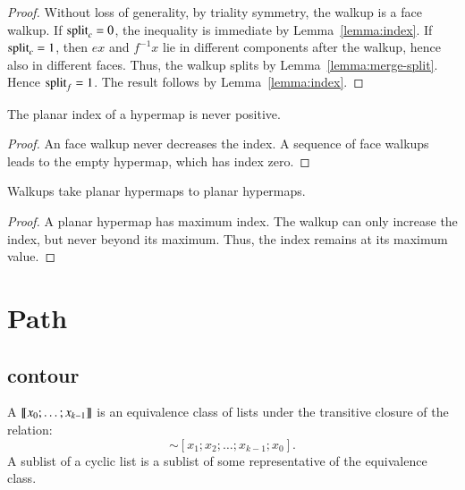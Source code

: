 \begin{proof} Without loss of generality, by triality symmetry, the
walkup is a face walkup.  If ${\operatorname{split}}_c=0$, the inequality is
immediate by Lemma~\ref{lemma:index}.  If ${\operatorname{split}}_c=1$, 
then $e x$ and $f^{-1} x$ lie in
different components after the walkup, hence also in different
faces.  Thus, the walkup splits by Lemma~\ref{lemma:merge-split}.
Hence  ${\operatorname{split}}_f = 1$.  The result
follows by Lemma~\ref{lemma:index}.
\end{proof}


\begin{lemma}
The planar index
of a hypermap is never positive.
\end{lemma}

\begin{proof}  An face walkup never decreases the index.  A sequence
of face walkups leads to the empty hypermap, which has
index zero.
\end{proof}


\begin{lemma}
Walkups take planar hypermaps to planar
hypermaps.
\end{lemma}

\begin{proof}  
A planar hypermap has maximum index.  The walkup
can only increase the index, but never beyond its maximum.  
Thus, the index remains at its maximum value.
\end{proof}





\section{Path}

\subsection{contour}

\begin{definition}
A  ${\llbracket{x_0;\ldots;x_{k-1}}\rrbracket}$ is an equivalence class of lists under the transitive closure of the relation:
\begin{displaymath}
[x_0;x_1;x_2\ldots;x_{k-1}] \sim [x_1;x_2;\ldots;x_{k-1};x_0].
\end{displaymath}
A sublist of a cyclic list is a sublist of some representative of the equivalence class.
\end{definition}

